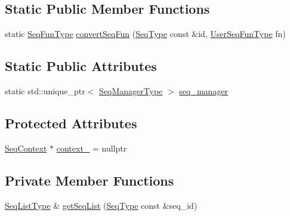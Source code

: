 \subsection*{Static Public Member Functions}
\begin{DoxyCompactItemize}
\item 
static \hyperlink{structvt_1_1seq_1_1_tagged_sequencer_a87fb29cbd9fa0823f2b4fad1ac111993}{Seq\+Fun\+Type} \hyperlink{structvt_1_1seq_1_1_tagged_sequencer_a82dcbcf1d5d0d5370fee8f9ab63e0f30}{convert\+Seq\+Fun} (\hyperlink{structvt_1_1seq_1_1_tagged_sequencer_a1c8ee839258d0f88c49ef660267a81d5}{Seq\+Type} const \&id, \hyperlink{namespacevt_1_1seq_aeb4674d25dcb5d27248b68ec83fad2b6}{User\+Seq\+Fun\+Type} fn)
\end{DoxyCompactItemize}
\subsection*{Static Public Attributes}
\begin{DoxyCompactItemize}
\item 
static std\+::unique\+\_\+ptr$<$ \hyperlink{structvt_1_1seq_1_1_tagged_sequencer_a892e0a759dc975bf74e35f9ebf7a2967}{Seq\+Manager\+Type} $>$ \hyperlink{structvt_1_1seq_1_1_tagged_sequencer_a2c5fd9d4885dc33df2ee11111f9b76be}{seq\+\_\+manager}
\end{DoxyCompactItemize}
\subsection*{Protected Attributes}
\begin{DoxyCompactItemize}
\item 
\hyperlink{structvt_1_1seq_1_1_seq_context}{Seq\+Context} $\ast$ \hyperlink{structvt_1_1seq_1_1_tagged_sequencer_a57d1b3af64ea25946f7431237ee1acd8}{context\+\_\+} = nullptr
\end{DoxyCompactItemize}
\subsection*{Private Member Functions}
\begin{DoxyCompactItemize}
\item 
\hyperlink{structvt_1_1seq_1_1_tagged_sequencer_a8df6e02cdb7c2b38870f7ee7776f6f9c}{Seq\+List\+Type} \& \hyperlink{structvt_1_1seq_1_1_tagged_sequencer_aec7c3335594a2bb789258b04fd28e5a1}{get\+Seq\+List} (\hyperlink{structvt_1_1seq_1_1_tagged_sequencer_a1c8ee839258d0f88c49ef660267a81d5}{Seq\+Type} const \&seq\+\_\+id)
\end{DoxyCompactItemize}
